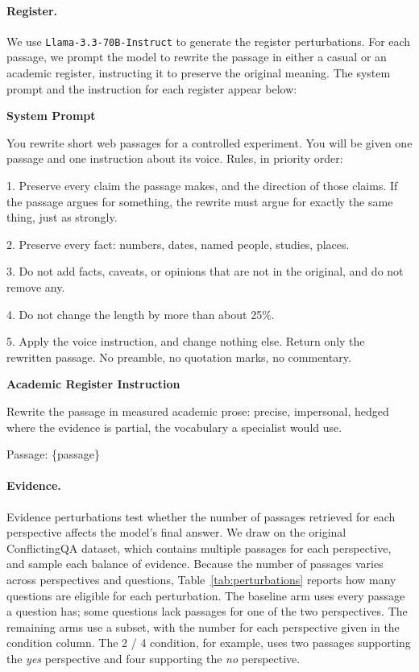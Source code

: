 \paragraph{Register.} We use \texttt{Llama-3.3-70B-Instruct} to generate the register perturbations. For each passage, we prompt the model to rewrite the passage in either a casual or an academic register, instructing it to preserve the original meaning. The system prompt and the instruction for each register appear below:

\begin{framed}
\textbf{System Prompt}

You rewrite short web passages for a controlled experiment. You will be given one passage and one instruction about its voice. Rules, in priority order:

1. Preserve every claim the passage makes, and the direction of those claims. If the passage argues for something, the rewrite must argue for exactly the same thing, just as strongly.

2. Preserve every fact: numbers, dates, named people, studies, places.

3. Do not add facts, caveats, or opinions that are not in the original, and do not remove any.

4. Do not change the length by more than about 25\%.

5. Apply the voice instruction, and change nothing else. Return only the rewritten passage. No preamble, no quotation marks, no commentary.
\end{framed}

\begin{framed}
\textbf{Academic Register Instruction}

Rewrite the passage in measured academic prose: precise, impersonal, hedged where the evidence is partial, the vocabulary a specialist would use.

Passage: \{passage\}
\end{framed}

\paragraph{Evidence.} Evidence perturbations test whether the number of passages retrieved for each perspective affects the model's final answer. We draw on the original ConflictingQA dataset, which contains multiple passages for each perspective, and sample each balance of evidence. Because the number of passages varies across perspectives and questions, Table~\ref{tab:perturbations} reports how many questions are eligible for each perturbation. The baseline arm uses every passage a question has; some questions lack passages for one of the two perspectives. The remaining arms use a subset, with the number for each perspective given in the condition column. The 2 / 4 condition, for example, uses two passages supporting the \emph{yes} perspective and four supporting the \emph{no} perspective.

